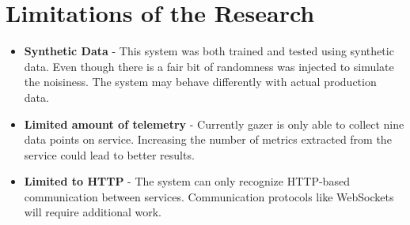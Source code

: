 \section{Limitations of the Research}

\begin{itemize}[noitemsep,nolistsep]
    \item \textbf{Synthetic Data} - This system was both trained and tested using synthetic data. Even though there is a fair bit of randomness was injected to simulate the noisiness. The system may behave differently with actual production data.
    \item \textbf{Limited amount of telemetry} - Currently \ac{gazer} is only able to collect nine data points on service. Increasing the number of metrics extracted from the service could lead to better results.
    \item \textbf{Limited to HTTP} - The system can only recognize HTTP-based communication between services. Communication protocols like WebSockets will require additional work.
\end{itemize}